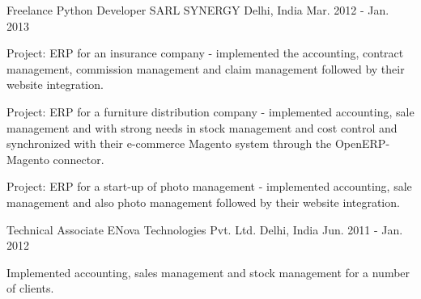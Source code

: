 \begin{cventries}
  \cventry
    {Freelance Python Developer} %
    {SARL SYNERGY} %
    {Delhi, India} %
    {Mar. 2012 - Jan. 2013} %
    {
      \begin{cvitems} %
        \item {Project: ERP for an insurance company - implemented the accounting, contract management, commission management and claim management followed by their website integration.}
        \item {Project: ERP for a furniture distribution company - implemented accounting, sale management and with strong needs in stock management and cost control and synchronized with their e-commerce Magento system through the OpenERP-Magento connector.}
        \item {Project: ERP for a start-up of photo management - implemented accounting, sale management and also photo management followed by their website integration.}
      \end{cvitems}
    }

  \cventry
    {Technical Associate} %
    {ENova Technologies Pvt. Ltd.} %
    {Delhi, India} %
    {Jun. 2011 - Jan. 2012} %
    {
      \begin{cvitems} %
        \item {Implemented accounting, sales management and stock management for a number of clients.}
      \end{cvitems}
    }

\end{cventries}
